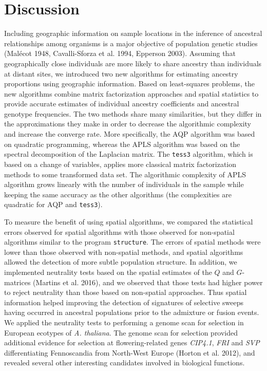 \clearpage
\newpage



\section{Discussion}

Including geographic information on sample locations in the inference of ancestral relationships among  organisms is a major objective of population genetic studies (Mal\'ecot 1948, Cavalli-Sforza et al. 1994, Epperson 2003). Assuming that geographically close individuals are more likely to share ancestry than individuals at distant sites, we introduced two new  algorithms for estimating ancestry proportions using geographic information. Based on least-squares problems, the new algorithms combine matrix factorization approaches and spatial statistics to provide accurate estimates of individual ancestry coefficients and ancestral genotype frequencies. The two methods share many similarities, but they differ in the approximations they make in order to decrease the algorithmic complexity and  increase the converge rate.  More specifically, the AQP algorithm was based on quadratic programming, whereas the APLS algorithm was based on the spectral decomposition of the Laplacian matrix. The {\tt tess3} algorithm, which is based on a change of variables, applies more classical matrix factorization methods to some transformed data set. The algorithmic complexity of APLS algorithm grows linearly with the number of individuals in the sample while keeping the same accuracy as the other algorithms (the complexities are quadratic for AQP and {\tt tess3}). 


To measure the benefit of using spatial algorithms, we compared the statistical errors observed for spatial algorithms with those observed for non-spatial algorithms similar to the program {\tt structure}. The errors of spatial methods were lower than those observed  with non-spatial methods, and spatial algorithms allowed the detection of more subtle population structure. In addition, we implemented neutrality tests based on the spatial estimates of the $Q$ and $G$-matrices (Martins et al. 2016), and we observed that those tests had higher power to reject neutrality than those based on non-spatial approaches. Thus spatial information helped improving the detection of signatures of selective sweeps having occurred  in ancestral populations prior to the admixture or fusion events. We applied the neutrality tests to performing a genome scan for selection in European ecotypes of {\it A. thaliana}. The genome scan for selection provided additional evidence for selection at flowering-related genes {\it CIP4.1}, {\it FRI} and {\it SVP} differentiating Fennoscandia from North-West Europe (Horton et al. 2012), and revealed several other interesting candidates involved in biological functions.
 

